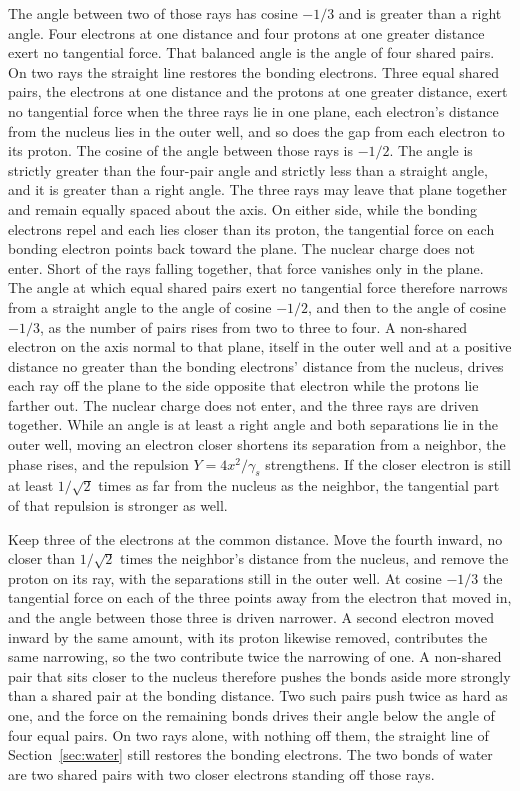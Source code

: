\documentclass[a4paper]{article}
\begin{document}
The angle between two of those rays has cosine \(-1/3\) and is greater than a right angle. Four electrons at one distance and four protons at one greater distance exert no tangential force. That balanced angle is the angle of four shared pairs. On two rays the straight line restores the bonding electrons. Three equal shared pairs, the electrons at one distance and the protons at one greater distance, exert no tangential force when the three rays lie in one plane, each electron's distance from the nucleus lies in the outer well, and so does the gap from each electron to its proton. The cosine of the angle between those rays is \(-1/2\). The angle is strictly greater than the four-pair angle and strictly less than a straight angle, and it is greater than a right angle. The three rays may leave that plane together and remain equally spaced about the axis. On either side, while the bonding electrons repel and each lies closer than its proton, the tangential force on each bonding electron points back toward the plane. The nuclear charge does not enter. Short of the rays falling together, that force vanishes only in the plane. The angle at which equal shared pairs exert no tangential force therefore narrows from a straight angle to the angle of cosine \(-1/2\), and then to the angle of cosine \(-1/3\), as the number of pairs rises from two to three to four. A non-shared electron on the axis normal to that plane, itself in the outer well and at a positive distance no greater than the bonding electrons' distance from the nucleus, drives each ray off the plane to the side opposite that electron while the protons lie farther out. The nuclear charge does not enter, and the three rays are driven together. While an angle is at least a right angle and both separations lie in the outer well, moving an electron closer shortens its separation from a neighbor, the phase rises, and the repulsion \(Y=4x^{2}/\gamma_s\) strengthens. If the closer electron is still at least \(1/\sqrt{2}\) times as far from the nucleus as the neighbor, the tangential part of that repulsion is stronger as well.

Keep three of the electrons at the common distance. Move the fourth inward, no closer than \(1/\sqrt{2}\) times the neighbor's distance from the nucleus, and remove the proton on its ray, with the separations still in the outer well. At cosine \(-1/3\) the tangential force on each of the three points away from the electron that moved in, and the angle between those three is driven narrower. A second electron moved inward by the same amount, with its proton likewise removed, contributes the same narrowing, so the two contribute twice the narrowing of one. A non-shared pair that sits closer to the nucleus therefore pushes the bonds aside more strongly than a shared pair at the bonding distance. Two such pairs push twice as hard as one, and the force on the remaining bonds drives their angle below the angle of four equal pairs. On two rays alone, with nothing off them, the straight line of Section~\ref{sec:water} still restores the bonding electrons. The two bonds of water are two shared pairs with two closer electrons standing off those rays.
\end{document}

